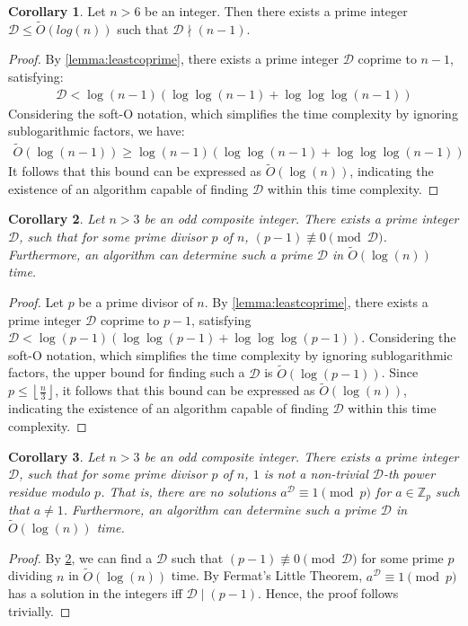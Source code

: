 \documentclass{article}
\theoremstyle{plain}
\theoremstyle{definition}
\newtheorem{corollary}{Corollary}
\newcommand{\floor}[1]{\left\lfloor #1 \right\rfloor}
\newcommand{\D}{\mathcal{D}}
\begin{document}
\begin{corollary} \label{corollary:leastcoprimebounds}
Let $n > 6$ be an integer. Then there exists a prime integer $\D \leq \tilde{O}(log(n))$ such that $\D \nmid (n-1)$. 
\end{corollary}
\begin{proof}
By \cref{lemma:leastcoprime}, there exists a prime integer $\D$ coprime to $n-1$, satisfying:
\begin{align*}
    \D < \log(n-1) \left( \log\log(n-1) + \log\log\log(n-1) \right)
\end{align*}
Considering the soft-O notation, which simplifies the time complexity by ignoring sublogarithmic factors, we have:
\begin{align*}
    \tilde{O}(\log(n-1)) \geq \log(n-1) \left( \log\log(n-1) + \log\log\log(n-1) \right)
\end{align*}
It follows that this bound can be expressed as $\tilde{O}(\log(n))$, indicating the existence of an algorithm capable of finding $\D$ within this time complexity.
\end{proof}

\begin{corollary} \label{corollary:findingprimep}
\textit{Let $n>3$ be an odd composite integer. There exists a prime integer $\D$, such that for some prime divisor $p$ of $n$, $(p-1) \not\equiv 0 \pmod{\D}$. Furthermore, an algorithm can determine such a prime $\D$ in $\tilde{O}(\log(n))$ time.}
\end{corollary}
\begin{proof}
Let $p$ be a prime divisor of $n$. By \cref{lemma:leastcoprime}, there exists a prime integer $\D$ coprime to $p-1$, satisfying $\D < \log(p-1) \left( \log\log(p-1) + \log\log\log(p-1) \right)$. Considering the soft-O notation, which simplifies the time complexity by ignoring sublogarithmic factors, the upper bound for finding such a $\D$ is $\tilde{O}(\log(p-1))$. Since $p \leq \floor{\frac{n}{3}}$, it follows that this bound can be expressed as $\tilde{O}(\log(n))$, indicating the existence of an algorithm capable of finding $\D$ within this time complexity.
\end{proof}

\begin{corollary} \label{corollary:findingprimepnonresidue}
\textit{Let $n>3$ be an odd composite integer. There exists a prime integer $\D$, such that for some prime divisor $p$ of $n$, $1$ is not a non-trivial $\D$-th power residue modulo $p$. That is, there are no solutions $a^\D \equiv 1 \pmod{p}$ for $a \in \mathbb{Z}_p$ such that $a \not= 1$. Furthermore, an algorithm can determine such a prime $\D$ in $\tilde{O}(\log(n))$ time.}
\end{corollary}
\begin{proof}
By \cref{corollary:findingprimep}, we can find a $\D$ such that $(p-1) \not\equiv 0 \pmod{\D}$ for some prime $p$ dividing $n$ in $\tilde{O}(\log(n))$ time. By Fermat's Little Theorem, $a^\D \equiv 1 \pmod{p}$ has a solution in the integers iff $\D \mid (p-1)$. Hence, the proof follows trivially.
\end{proof}
\end{document}

